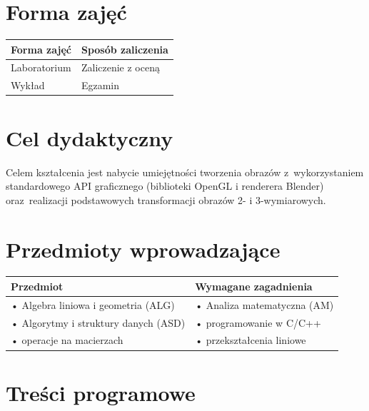 \documentclass[12pt, a4paper]{article}
\begin{document}
\section{Forma zajęć}

\begin{tabular}{ll}
  \hline
  \textbf{Forma zajęć} & \textbf{Sposób zaliczenia} \\
  \hline
  Laboratorium & Zaliczenie z oceną \\
  Wykład & Egzamin \\
  \hline
\end{tabular}

\section{Cel dydaktyczny}

Celem kształcenia jest nabycie umiejętności tworzenia obrazów z wykorzystaniem standardowego API graficznego (biblioteki OpenGL i renderera Blender) oraz realizacji podstawowych transformacji obrazów 2- i 3-wymiarowych.

\section{Przedmioty wprowadzające}

\begin{tabularx}{\textwidth}{lX}
  \hline
  \textbf{Przedmiot} & \textbf{Wymagane zagadnienia} \\
  \hline
  • Algebra liniowa i geometria  (ALG) & • Analiza matematyczna  (AM) \\
  • Algorytmy i struktury danych (ASD) & • programowanie w C/C++ \\
  • operacje na macierzach & • przekształcenia liniowe \\
  \hline
\end{tabularx}

\section{Treści programowe}
\end{document}

